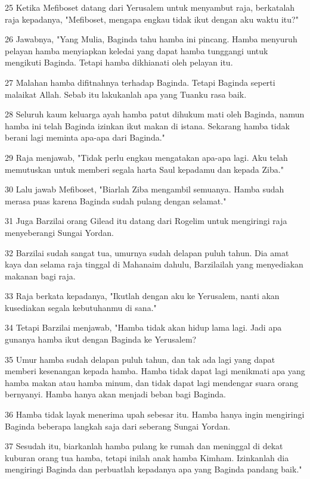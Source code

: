 \par 25 Ketika Mefiboset datang dari Yerusalem untuk menyambut raja, berkatalah raja kepadanya, "Mefiboset, mengapa engkau tidak ikut dengan aku waktu itu?"
\par 26 Jawabnya, "Yang Mulia, Baginda tahu hamba ini pincang. Hamba menyuruh pelayan hamba menyiapkan keledai yang dapat hamba tunggangi untuk mengikuti Baginda. Tetapi hamba dikhianati oleh pelayan itu.
\par 27 Malahan hamba difitnahnya terhadap Baginda. Tetapi Baginda seperti malaikat Allah. Sebab itu lakukanlah apa yang Tuanku rasa baik.
\par 28 Seluruh kaum keluarga ayah hamba patut dihukum mati oleh Baginda, namun hamba ini telah Baginda izinkan ikut makan di istana. Sekarang hamba tidak berani lagi meminta apa-apa dari Baginda."
\par 29 Raja menjawab, "Tidak perlu engkau mengatakan apa-apa lagi. Aku telah memutuskan untuk memberi segala harta Saul kepadamu dan kepada Ziba."
\par 30 Lalu jawab Mefiboset, "Biarlah Ziba mengambil semuanya. Hamba sudah merasa puas karena Baginda sudah pulang dengan selamat."
\par 31 Juga Barzilai orang Gilead itu datang dari Rogelim untuk mengiringi raja menyeberangi Sungai Yordan.
\par 32 Barzilai sudah sangat tua, umurnya sudah delapan puluh tahun. Dia amat kaya dan selama raja tinggal di Mahanaim dahulu, Barzilailah yang menyediakan makanan bagi raja.
\par 33 Raja berkata kepadanya, "Ikutlah dengan aku ke Yerusalem, nanti akan kusediakan segala kebutuhanmu di sana."
\par 34 Tetapi Barzilai menjawab, "Hamba tidak akan hidup lama lagi. Jadi apa gunanya hamba ikut dengan Baginda ke Yerusalem?
\par 35 Umur hamba sudah delapan puluh tahun, dan tak ada lagi yang dapat memberi kesenangan kepada hamba. Hamba tidak dapat lagi menikmati apa yang hamba makan atau hamba minum, dan tidak dapat lagi mendengar suara orang bernyanyi. Hamba hanya akan menjadi beban bagi Baginda.
\par 36 Hamba tidak layak menerima upah sebesar itu. Hamba hanya ingin mengiringi Baginda beberapa langkah saja dari seberang Sungai Yordan.
\par 37 Sesudah itu, biarkanlah hamba pulang ke rumah dan meninggal di dekat kuburan orang tua hamba, tetapi inilah anak hamba Kimham. Izinkanlah dia mengiringi Baginda dan perbuatlah kepadanya apa yang Baginda pandang baik."
